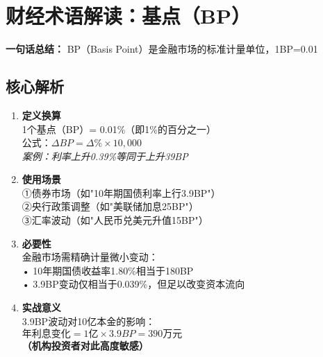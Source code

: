 \section{财经术语解读：基点（BP）}
\textbf{一句话总结：}  
BP（Basis Point）是金融市场的标准计量单位，1BP=0.01%

\subsection{核心解析}
\begin{enumerate}[leftmargin=*, nosep]
    \item \textbf{定义换算}  \\
    1个基点（BP）= 0.01\%（即1\%的百分之一）\\
    公式：$ \Delta BP = \Delta \% \times 10,000 $ \\
    \textit{案例：利率上升0.39\%等同于上升39BP}
    
    \item \textbf{使用场景}  \\
    ①债券市场（如"10年期国债利率上行3.9BP"）\\
    ②央行政策调整（如"美联储加息25BP"）\\
    ③汇率波动（如"人民币兑美元升值15BP"）
    
    \item \textbf{必要性}  \\
    金融市场需精确计量微小变动：\\
    • 10年期国债收益率1.80\%相当于180BP\\
    • 3.9BP变动仅相当于0.039\%，但足以改变资本流向
    
    \item \textbf{实战意义}  \\
    3.9BP波动对10亿本金的影响：\\
    $ \text{年利息变化} = 1\text{亿} \times 3.9BP = 390\text{万元} $ \\
    {\color{red}\textbf{（机构投资者对此高度敏感）}}
\end{enumerate}

